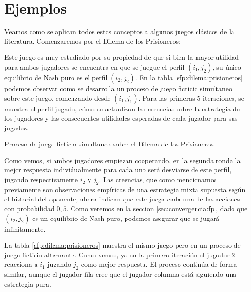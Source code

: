 

\section{Ejemplos}

Veamos como se aplican todos estos conceptos a algunos juegos clásicos de la literatura. Comenzaremos por el Dilema de los Prisioneros:





Este juego es muy estudiado por su propiedad de que si bien la mayor utilidad para ambos jugadores se encuentra en que se juegue el perfil $(i_1, j_2)$, su único equilibrio de Nash puro es el perfil $(i_2, j_2)$. En la tabla \ref{sfp:dilema:prisioneros} podemos observar como se desarrolla un proceso de juego ficticio simultaneo sobre este juego, comenzando desde $(i_1, j_1)$. Para las primeras 5 iteraciones, se muestra el perfil jugado, cómo se actualizan las creencias sobre la estrategia de los jugadores y las consecuentes utilidades esperadas de cada jugador para sus jugadas.

\begin{table} %
    \centering
    
    \caption{Proceso de juego ficticio simultaneo sobre el Dilema de los Prisioneros}
    \label{sfp:dilema:prisioneros}
\end{table}

Como vemos, si ambos jugadores empiezan cooperando, en la segunda ronda la mejor respuesta individualmente para cada uno será desviarse de este perfil, jugando respectivamente $i_2$ y $j_2$. Las creencias, que como mencionamos previamente son observaciones empíricas de una estrategia mixta supuesta según el historial del oponente, ahora indican que este juega cada una de las acciones con probabilidad $0,5$. Como veremos en la seccion \ref{sec:convergencia:fp}, dado que $(i_2, j_2)$ es un equilibrio de Nash puro, podemos asegurar que se jugará infinitamente.

La tabla \ref{afp:dilema:prisioneros} muestra el mismo juego pero en un proceso de juego ficticio alternante. Como vemos, ya en la primera iteración el jugador $2$ reacciona a $i_1$ jugando $j_2$ como mejor respuesta. El proceso continúa de forma similar, aunque el jugador fila cree que el jugador columna está siguiendo una estrategia pura.


